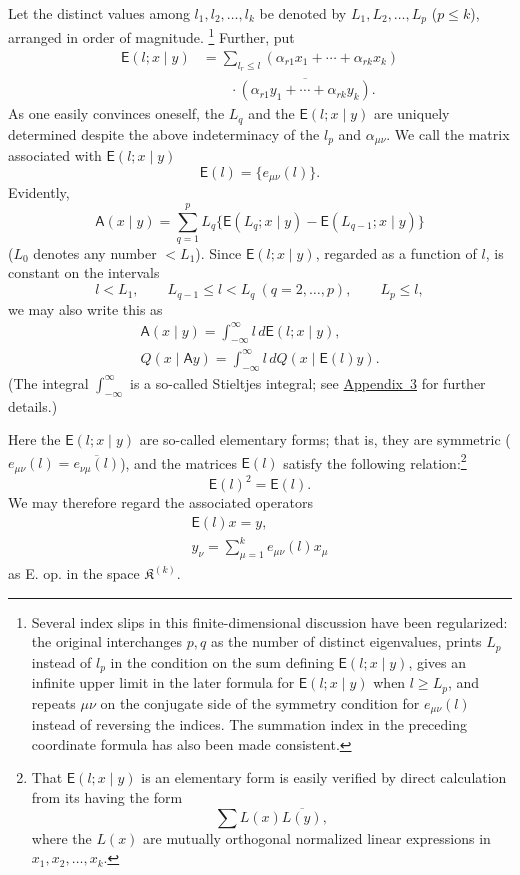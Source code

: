 \documentclass[fontsize=13pt,paper=b5,twoside,bookmarkpackage=false]{scrartcl}
\newcommand{\App}[1]{\hyperref[app:#1]{Appendix~#1}}
\newcounter{translatornote}
\newcommand{\tnote}[1]{%
  \begingroup\stepcounter{translatornote}%
  \renewcommand{\thefootnote}{T\arabic{translatornote}}%
  \footnote[0]{#1}\endgroup}
\begin{document}
Let the distinct values among $l_1,l_2,\ldots,l_k$ be denoted by $L_1,L_2,\ldots,L_p$ ($p\leq k$), arranged in order of magnitude.\tnote{Several index slips in this finite-dimensional discussion have been regularized: the original interchanges $p,q$ as the number of distinct eigenvalues, prints $L_p$ instead of $l_p$ in the condition on the sum defining $\mathsf{E}(l;x\mid y)$, gives an infinite upper limit in the later formula for $\mathsf{E}(l;x\mid y)$ when $l\geq L_p$, and repeats $\mu\nu$ on the conjugate side of the symmetry condition for $e_{\mu\nu}(l)$ instead of reversing the indices. The summation index in the preceding coordinate formula has also been made consistent.} Further, put
\begin{align*}
 \mathsf{E}(l;x\mid y)
 &=\sum_{l_r\leq l}(\alpha_{r1}x_1+\cdots+\alpha_{rk}x_k)\\
 &\qquad\cdot\overline{(\alpha_{r1}y_1+\cdots+\alpha_{rk}y_k)}.
\end{align*}
As one easily convinces oneself, the $L_q$ and the $\mathsf{E}(l;x\mid y)$ are uniquely determined despite the above indeterminacy of the $l_p$ and $\alpha_{\mu\nu}$. We call the matrix associated with $\mathsf{E}(l;x\mid y)$
\[
 \mathsf{E}(l)=\{e_{\mu\nu}(l)\}.
\]
Evidently,
\[
 \mathsf{A}(x\mid y)=\sum_{q=1}^{p}L_q
 \{\mathsf{E}(L_q;x\mid y)-\mathsf{E}(L_{q-1};x\mid y)\}
\]
($L_0$ denotes any number $<L_1$). Since $\mathsf{E}(l;x\mid y)$, regarded as a function of $l$, is constant on the intervals
\[
 l<L_1,\qquad L_{q-1}\leq l<L_q\ (q=2,\ldots,p),\qquad L_p\leq l,
\]
we may also write this as
\begin{gather*}
 \mathsf{A}(x\mid y)=\int_{-\infty}^{\infty}l\,d\mathsf{E}(l;x\mid y),\\
 Q(x\mid\mathsf{A}y)=\int_{-\infty}^{\infty}l\,dQ(x\mid\mathsf{E}(l)y).
\end{gather*}
(The integral $\int_{-\infty}^{\infty}$ is a so-called Stieltjes integral; see \App{3} for further details.)

Here the $\mathsf{E}(l;x\mid y)$ are so-called elementary forms; that is, they are symmetric ($e_{\mu\nu}(l)=\overline{e_{\nu\mu}(l)}$), and the matrices $\mathsf{E}(l)$ satisfy the following relation:\footnote[25]{\label{fn:25}That $\mathsf{E}(l;x\mid y)$ is an elementary form is easily verified by direct calculation from its having the form
\[
 \sum L(x)\overline{L(y)},
\]
where the $L(x)$ are mutually orthogonal normalized linear expressions in $x_1,x_2,\ldots,x_k$.}
\[
 \mathsf{E}(l)^2=\mathsf{E}(l).
\]
We may therefore regard the associated operators
\begin{gather*}
 \mathsf{E}(l)x=y,\\
 y_\nu=\sum_{\mu=1}^{k}e_{\mu\nu}(l)x_\mu
\end{gather*}
as E. op. in the space $\mathfrak{K}^{(k)}$.
\end{document}

